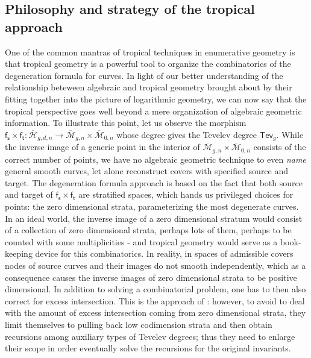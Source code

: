 \documentclass[11pt,reqno]{amsart}
\theoremstyle{definition}
\newcommand{\calM}{\mathcal{M}}
\newcommand{\Mbar}{\overline{\calM}}
\newcommand\Mgnbar[1]{\Mbar_{#1}}
\newcommand\Adm[1]{ \mathcal{ \overline{H}}_{#1}}
\newcommand{\ft}{\mathsf{f_t}}
\newcommand{\fs}{\mathsf{f_s}}
\newcommand{\Tev}{{\mathsf{Tev}}}
\begin{document}
\subsection{Philosophy and strategy of the tropical approach} One of the common mantras of tropical techniques in enumerative geometry is that tropical geometry is a powerful tool to organize the combinatorics of the degeneration formula for curves. In light of our better understanding of the relationship beteween algebraic and tropical geometry brought about by their fitting together into the picture of logarithmic geometry, we can now say that the tropical perspective goes well beyond a mere organization of algebraic geometric information. To illustrate this point, let us observe the morphism $\fs\times\ft:\Adm{g,d,n} \to \Mgnbar{g,n} \times \Mgnbar{0,n}$ whose degree gives the Tevelev degree $\Tev_g$. While the inverse image of a generic point in the interior of $\Mgnbar{g,n} \times \Mgnbar{0,n}$ consists of the correct number of points, we have no algebraic geometric technique to even {\it name} general smooth curves, let alone reconstruct covers with specified source and target. The degeneration formula approach is based on the fact that both source and target of $\fs\times \ft$ are stratified spaces, which hands us privileged choices for points: the zero dimensional strata, parameterizing the most degenerate curves. In an ideal world, the inverse image of a zero dimensional stratum would consist of a collection of zero dimensional strata, perhaps lots of them, perhaps to be counted with some multiplicities - and tropical geometry would serve as a book-keeping device for this combinatorics. In reality, in spaces of admissible covers nodes of source curves  and their images do not  smooth independently, which as a consequence causes the inverse images of zero dimensional strata  to be positive dimensional. In addition to solving a combinatorial problem, one has to then also correct for excess intersection. This is the approach of \cite{CPS:Tevdeg}: however, to avoid to deal with the amount of excess intersection coming from zero dimensional strata, they limit themselves to pulling back low codimension strata and then obtain recursions among auxiliary types  of Tevelev degrees; thus they need to enlarge their scope in order eventually solve the recursions for the original invariants. 
\end{document}
